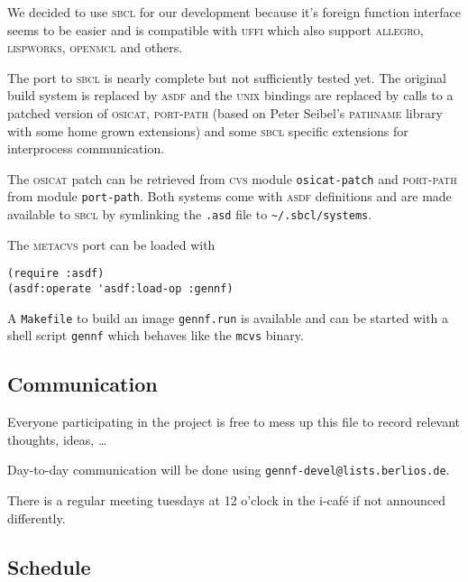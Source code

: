 \documentclass[fleqn, 10pt, a4paper]{article}
\begin{document}
We decided to use \textsc{sbcl} for our development because it's
foreign function interface seems to be easier and is compatible with
\textsc{uffi} which also support \textsc{allegro}, \textsc{lispworks},
\textsc{openmcl} and others.

The port to \textsc{sbcl} is nearly complete but not sufficiently
tested yet. The original build system is replaced by \textsc{asdf}
and the \textsc{unix} bindings are replaced by calls to a patched version of
\textsc{osicat}, \textsc{port-path} (based on Peter Seibel's
\textsc{pathname} library with some home grown extensions) and some
\textsc{sbcl} specific extensions for interprocess communication.

The \textsc{osicat} patch can be retrieved from \textsc{cvs}
module \texttt{osicat-patch} and \textsc{port-path} from
module \texttt{port-path}. Both systems come with \textsc{asdf}
definitions and are made available to \textsc{sbcl} by symlinking
the \texttt{.asd} file to \texttt{\textasciitilde{}/.sbcl/systems}.

The \textsc{metacvs} port can be loaded with

\begin{verbatim}
(require :asdf)
(asdf:operate 'asdf:load-op :gennf)
\end{verbatim}

A \texttt{Makefile} to build an image \texttt{gennf.run}
is available and can be started with a shell script \texttt{gennf}
which behaves like the \texttt{mcvs} binary.


\subsection{Communication}
Everyone participating in the project is free to mess up this file to
record relevant thoughts, ideas, \ldots

Day-to-day communication will be done using
\texttt{gennf-devel@lists.berlios.de}.

There is a regular meeting tuesdays at 12 o'clock in the i-caf\'e if
not announced differently.

\subsection{Schedule \label{schedule}}
\end{document}
